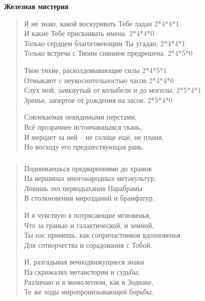 \documentclass{beamer}
\begin{document}
\begin{frame}

\begin{center}
\textbf{Железная мистерия}
\end{center}

\begin{verse}

Я не знаю, какой воскуривать Тебе ладан				2*4*4*1\\
И какие Тебе присваивать имена.						2*4*4*0\\
Только сердцем благоговеющим Ты угадан,			2*4*4*1\\
Только встреча с Твоим сиянием предрешена.		2*4*5*0

Твои тихие, расколдовывающие силы					2*4*5*1\\
Отмыкают с неукоснительностью часов				2*4*4*0\\
Слух мой, замкнутый от колыбели и до могилы,	2*5*4*1\\
Зренье, запертое от рождения на засов.				2*5*4*0

Совлекаемая невидимыми перстами,\\
Всё прозрачнее истончающаяся  ткань,\\
И мерцает за ней – не солнце ещё, не пламя,\\
Но восходу его предшествующая рань.
\end{verse}
\end{frame}


\begin{frame}
\frametitle{}

\begin{verse}
Поднимаешься предварениями до храмов\\
На вершинах многонародных метакультур,\\
Ловишь эхо перводыхания Парабрамы\\
В столкновении  мирозданий и брамфатур.

И я чувствую в потрясающие мгновенья,\\
Что за гранью и галактической, и земной,\\
Ты нас примешь, как сопричастников вдохновенья\\
Для сотворчества и сорадования  с Тобой.

И, разгадывая  вечнодвижущиеся знаки\\
На скрижалях метаистории и судьбы,\\
Различаю и в мимолетном, как в Зодиаке,\\
Те же ходы миропронизывающей борьбы.


\end{verse}
\end{frame}
\end{document}
